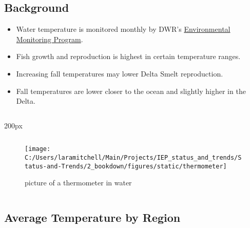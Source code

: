 \documentclass[
]{book}
\providecommand{\tightlist}{%
  \setlength{\itemsep}{0pt}\setlength{\parskip}{0pt}}
\begin{document}
\begin{columns-nocenter}

\begin{column}{0.7\textwidth}
\begin{column}

\hypertarget{background-1}{%
\subsection{Background}\label{background-1}}

\begin{itemize}
\tightlist
\item
  Water temperature is monitored monthly by DWR's \href{https://emp.baydeltalive.com/wiki/12297}{Environmental Monitoring Program}.
\item
  Fish growth and reproduction is highest in certain temperature ranges.
\item
  Increasing fall temperatures may lower Delta Smelt reproduction.
\item
  Fall temperatures are lower closer to the ocean and slightly higher in the Delta.
\end{itemize}

\end{column}
\end{column}

\begin{column}{200px\textwidth}
\begin{column}

\begin{figure}

{\centering \texttt{[image: C:/Users/laramitchell/Main/Projects/IEP\_status\_and\_trends/Status-and-Trends/2\_bookdown/figures/static/thermometer]} 

}

\caption{picture of a thermometer in water}\label{fig:unnamed-chunk-100}
\end{figure}

\end{column}
\end{column}

\end{columns-nocenter}

\hypertarget{average-temperature-by-region}{%
\subsection{Average Temperature by Region}\label{average-temperature-by-region}}
\end{document}
